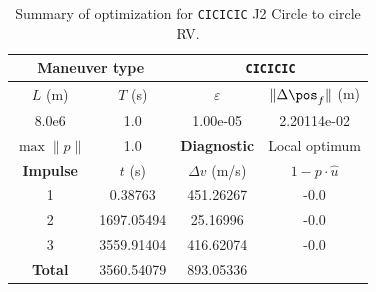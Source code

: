 \begin{table}[htpb]
    \centering
    \begin{tabular}{cccc} \toprule
    \multicolumn{2}{c}{\textbf{Maneuver type}} & \multicolumn{2}{c}{\texttt{CICICIC}} \\ \midrule
    \(L\) (m) & \(T\) (s) & \(\varepsilon\) & \(\lVert \Delta \pos_{f} \rVert\) (m)    \\ \midrule
    8.0e6          & 1.0          & 1.00e-05                & 2.20114e-02                        \\ \midrule
    \(\max \lVert p \rVert\) & 1.0     & \textbf{Diagnostic}   & Local optimum        \\ \midrule
    \textbf{Impulse} & \(t\) (s) & \(\Delta v\) (m/s) & \(1 - p \cdot \hat{u}\) \\ \midrule
    1                 & 0.38763          & 451.26267             & -0.0                    \\
    2                 & 1697.05494          & 25.16996             & -0.0                    \\
    3                 & 3559.91404          & 416.62074             & -0.0                    \\\midrule
    \textbf{Total}   & 3560.54079          & 893.05336             &                     \\ \bottomrule   
    \end{tabular}
    \caption{Summary of optimization for \texttt{CICICIC} J2 Circle to circle RV.}
    \label{tab:J2_ctcr_CICICIC_tab}
\end{table}


